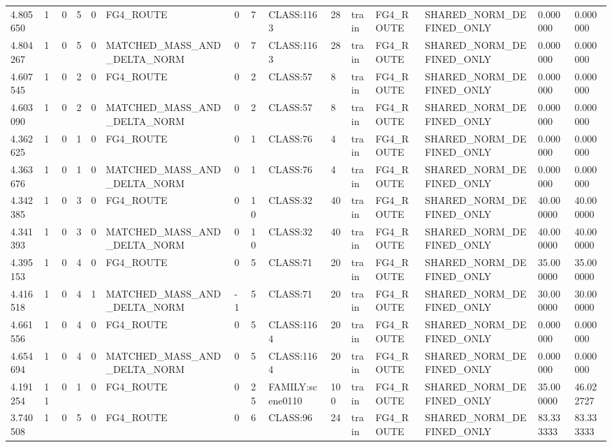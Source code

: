 \begin{tabular}{lllllllllllllll}
4.805650 & 1 & 0 & 5 & 0 & FG4\_ROUTE & 0 & 7 & CLASS:1163 & 28 & train & FG4\_ROUTE & SHARED\_NORM\_DEFINED\_ONLY & 0.000000 & 0.000000 \\
4.804267 & 1 & 0 & 5 & 0 & MATCHED\_MASS\_AND\_DELTA\_NORM & 0 & 7 & CLASS:1163 & 28 & train & FG4\_ROUTE & SHARED\_NORM\_DEFINED\_ONLY & 0.000000 & 0.000000 \\
4.607545 & 1 & 0 & 2 & 0 & FG4\_ROUTE & 0 & 2 & CLASS:57 & 8 & train & FG4\_ROUTE & SHARED\_NORM\_DEFINED\_ONLY & 0.000000 & 0.000000 \\
4.603090 & 1 & 0 & 2 & 0 & MATCHED\_MASS\_AND\_DELTA\_NORM & 0 & 2 & CLASS:57 & 8 & train & FG4\_ROUTE & SHARED\_NORM\_DEFINED\_ONLY & 0.000000 & 0.000000 \\
4.362625 & 1 & 0 & 1 & 0 & FG4\_ROUTE & 0 & 1 & CLASS:76 & 4 & train & FG4\_ROUTE & SHARED\_NORM\_DEFINED\_ONLY & 0.000000 & 0.000000 \\
4.363676 & 1 & 0 & 1 & 0 & MATCHED\_MASS\_AND\_DELTA\_NORM & 0 & 1 & CLASS:76 & 4 & train & FG4\_ROUTE & SHARED\_NORM\_DEFINED\_ONLY & 0.000000 & 0.000000 \\
4.342385 & 1 & 0 & 3 & 0 & FG4\_ROUTE & 0 & 10 & CLASS:32 & 40 & train & FG4\_ROUTE & SHARED\_NORM\_DEFINED\_ONLY & 40.000000 & 40.000000 \\
4.341393 & 1 & 0 & 3 & 0 & MATCHED\_MASS\_AND\_DELTA\_NORM & 0 & 10 & CLASS:32 & 40 & train & FG4\_ROUTE & SHARED\_NORM\_DEFINED\_ONLY & 40.000000 & 40.000000 \\
4.395153 & 1 & 0 & 4 & 0 & FG4\_ROUTE & 0 & 5 & CLASS:71 & 20 & train & FG4\_ROUTE & SHARED\_NORM\_DEFINED\_ONLY & 35.000000 & 35.000000 \\
4.416518 & 1 & 0 & 4 & 1 & MATCHED\_MASS\_AND\_DELTA\_NORM & -1 & 5 & CLASS:71 & 20 & train & FG4\_ROUTE & SHARED\_NORM\_DEFINED\_ONLY & 30.000000 & 30.000000 \\
4.661556 & 1 & 0 & 4 & 0 & FG4\_ROUTE & 0 & 5 & CLASS:1164 & 20 & train & FG4\_ROUTE & SHARED\_NORM\_DEFINED\_ONLY & 0.000000 & 0.000000 \\
4.654694 & 1 & 0 & 4 & 0 & MATCHED\_MASS\_AND\_DELTA\_NORM & 0 & 5 & CLASS:1164 & 20 & train & FG4\_ROUTE & SHARED\_NORM\_DEFINED\_ONLY & 0.000000 & 0.000000 \\
4.191254 & 11 & 0 & 1 & 0 & FG4\_ROUTE & 0 & 25 & FAMILY:scene0110 & 100 & train & FG4\_ROUTE & SHARED\_NORM\_DEFINED\_ONLY & 35.000000 & 46.022727 \\
3.740508 & 1 & 0 & 5 & 0 & FG4\_ROUTE & 0 & 6 & CLASS:96 & 24 & train & FG4\_ROUTE & SHARED\_NORM\_DEFINED\_ONLY & 83.333333 & 83.333333 \\

\end{tabular}
